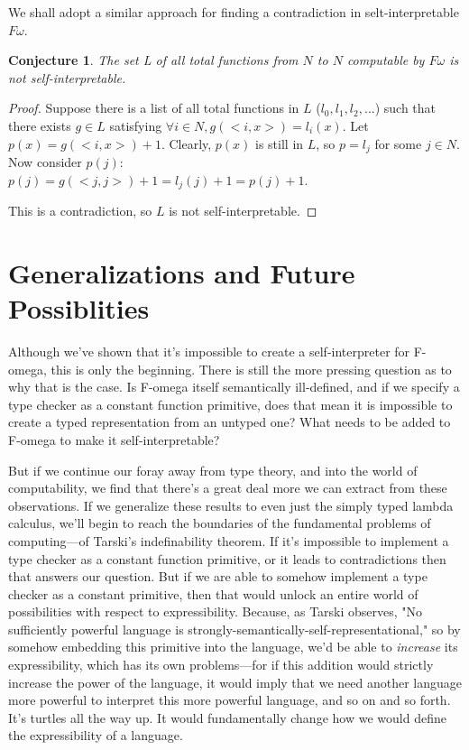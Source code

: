 \documentclass{article}
\newtheorem{conjecture}{Conjecture}
\begin{document}
We shall adopt a similar approach for finding a contradiction in selt-interpretable $F\omega$.

\begin{conjecture}
The set L of all total functions from $N$ to $N$ computable by $F\omega$ is not self-interpretable.
\end{conjecture}

\begin{proof}
    Suppose there is a list of all total functions in $L$ ($l_0, l_1, l_2, ...$) such that there exists $g \in L$ satisfying $\forall i \in N, g(<i, x>) = l_i(x)$. Let $p(x) = g(<i, x>) + 1$. Clearly, $p(x)$ is still in $L$, so $p = l_j$ for some $j \in N$. Now consider $p(j)$:\\
    $p(j)=g(<j, j>)+1=l_j(j) + 1 = p(j) + 1$.

    This is a contradiction, so $L$ is not self-interpretable.
\end{proof}

\section{Generalizations and Future Possiblities}

Although we've shown that it's impossible to create a self-interpreter for F-omega, this is only the beginning. There is still the more pressing question as to why that is the case. Is F-omega itself semantically ill-defined, and if we specify a type checker as a constant function primitive, does that mean it is impossible to create a typed representation from an untyped one? What needs to be added to F-omega to make it self-interpretable?

But if we continue our foray away from type theory, and into the world of computability, we find that there's a great deal more we can extract from these observations. If we generalize these results to even just the simply typed lambda calculus, we'll begin to reach the boundaries of the fundamental problems of computing—of Tarski's indefinability theorem. If it's impossible to implement a type checker as a constant function primitive, or it leads to contradictions then that answers our question. But if we are able to somehow implement a type checker as a constant primitive, then that would unlock an entire world of possibilities with respect to expressibility. Because, as Tarski observes, "No sufficiently powerful language is strongly-semantically-self-representational," so by somehow embedding this primitive into the language, we'd be able to \textit{increase} its expressibility, which has its own problems—for if this addition would strictly increase the power of the language, it would imply that we need another language more powerful to interpret this more powerful language, and so on and so forth. It's turtles all the way up. It would fundamentally change how we would define the expressibility of a language.
\end{document}
